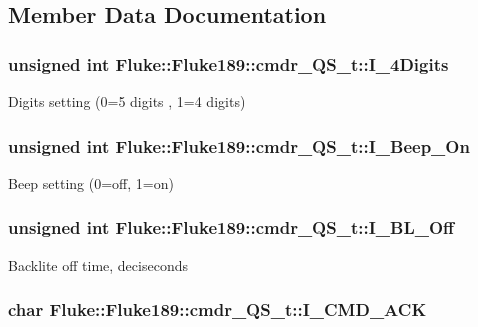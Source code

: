 \subsection{Member Data Documentation}
\hypertarget{structFluke_1_1Fluke189_1_1cmdr__QS__t_a6a49dfb0dca0dcd8dad482711112693d}{
\subsubsection[{I\_\-4Digits}]{\setlength{\rightskip}{0pt plus 5cm}unsigned int {\bf Fluke::Fluke189::cmdr\_\-QS\_\-t::I\_\-4Digits}}}
\label{structFluke_1_1Fluke189_1_1cmdr__QS__t_a6a49dfb0dca0dcd8dad482711112693d}
Digits setting (0=5 digits , 1=4 digits) \hypertarget{structFluke_1_1Fluke189_1_1cmdr__QS__t_a9d2d8906c189f591970802076393cea5}{
\subsubsection[{I\_\-Beep\_\-On}]{\setlength{\rightskip}{0pt plus 5cm}unsigned int {\bf Fluke::Fluke189::cmdr\_\-QS\_\-t::I\_\-Beep\_\-On}}}
\label{structFluke_1_1Fluke189_1_1cmdr__QS__t_a9d2d8906c189f591970802076393cea5}
Beep setting (0=off, 1=on) \hypertarget{structFluke_1_1Fluke189_1_1cmdr__QS__t_ab656118e2f6c46988422d5842277c0d7}{
\subsubsection[{I\_\-BL\_\-Off}]{\setlength{\rightskip}{0pt plus 5cm}unsigned int {\bf Fluke::Fluke189::cmdr\_\-QS\_\-t::I\_\-BL\_\-Off}}}
\label{structFluke_1_1Fluke189_1_1cmdr__QS__t_ab656118e2f6c46988422d5842277c0d7}
Backlite off time, deciseconds \hypertarget{structFluke_1_1Fluke189_1_1cmdr__QS__t_af806a40dd2e31a0cddaca3cfcf2614ce}{
\subsubsection[{I\_\-CMD\_\-ACK}]{\setlength{\rightskip}{0pt plus 5cm}char {\bf Fluke::Fluke189::cmdr\_\-QS\_\-t::I\_\-CMD\_\-ACK}}}

